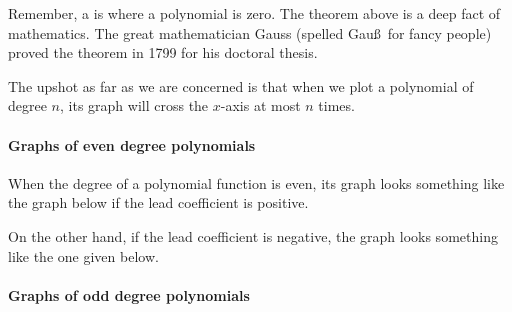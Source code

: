 \documentclass{ximera}
\begin{document}
Remember, a  is where a polynomial is zero. The theorem
above is a deep fact of mathematics. The great mathematician Gauss
(spelled Gau\ss\ for fancy people) proved the theorem in 1799 for his
doctoral thesis. 

The upshot as far as we are concerned is that when we plot a
polynomial of degree $n$, its graph will cross the $x$-axis at most
$n$ times.

\paragraph{Graphs of even degree polynomials}


When the degree of a polynomial function is even, its graph looks
something like the graph below if the lead coefficient is positive.

\begin{image}
\end{image}
On the other hand, if the lead coefficient is negative, the graph
looks something like the one given below.

\begin{image}
\end{image}

\paragraph{Graphs of odd degree polynomials}
\end{document}
